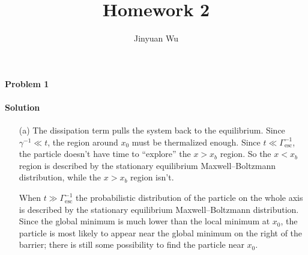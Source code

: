 \documentclass[hyperref, a4paper]{article}
\title{Homework 2}
\author{Jinyuan Wu}
\begin{document}
\maketitle

\paragraph{Problem 1} 

\paragraph{Solution} \begin{itemize}
\item[(a)] The dissipation term pulls the system back to the equilibrium.
Since $\gamma^{-1} \ll t$, the region around $x_0$ must be thermalized enough.
Since $t \ll \Gamma_{\text{esc}}^{-1}$,
the particle doesn't have time to ``explore'' the $x > x_b$ region.
So the $x < x_b$ region is described by the stationary equilibrium Maxwell–Boltzmann distribution,
while the $x > x_b$ region isn't.

When $t \gg \Gamma_{\text{esc}}^{-1}$
the probabilistic distribution of the particle on the whole axis is described 
by the stationary equilibrium Maxwell–Boltzmann distribution.
Since the global minimum is much lower than the local minimum at $x_0$,
the particle is most likely to appear near the global minimum on the right of the barrier;
there is still some possibility to find the particle near $x_0$.


\end{itemize}
\end{document}
